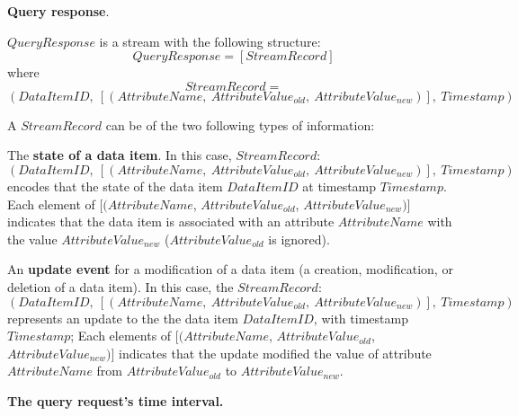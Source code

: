 \noindent
\textbf{Query response}.

\noindent
$QueryResponse$ is a stream with the following structure:
\[
  QueryResponse = [StreamRecord]
\]
where
\[
  StreamRecord =
\]
\[
  (DataItemID,~[(AttributeName,~AttributeValue_{old},~AttributeValue_{new})],~Timestamp)
\]

\noindent
A $StreamRecord$ can be of the two following types of information:
\begin{itemize}
  \begin{sloppypar}
  \item The \textbf{state of a data item}.
  In this case, $StreamRecord$:
  \[
  (DataItemID,~[(AttributeName,~AttributeValue_{old},~AttributeValue_{new})],~Timestamp)
  \]
  encodes that the state of the data item $DataItemID$ at timestamp $Timestamp$.
  Each element of $[(AttributeName$, $AttributeValue_{old}$, $AttributeValue_{new})]$ indicates that
  the data item is associated with an attribute $AttributeName$ with the value $AttributeValue_{new}$
  ($AttributeValue_{old}$ is ignored).
  \end{sloppypar}

  \begin{sloppypar}
  \item An \textbf{update event} for a modification of a data item (a creation, modification, or deletion
  of a data item).
  In this case, the $StreamRecord$:
  \[
  (DataItemID,~[(AttributeName,~AttributeValue_{old},~AttributeValue_{new})],~Timestamp)
  \]
  represents an update to the the data item $DataItemID$, with timestamp $Timestamp$;
  Each elements of $[(AttributeName$, $AttributeValue_{old}$, $AttributeValue_{new})]$ indicates that
  the update modified the value of attribute $AttributeName$ from $AttributeValue_{old}$ to $AttributeValue_{new}$.
  \end{sloppypar}
\end{itemize}

\medskip
\noindent
\textbf{The query request's time interval.}

